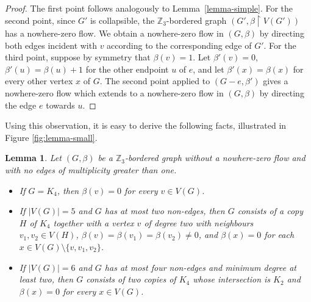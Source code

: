 \documentclass{article}
\newcommand{\Z}{\mathbb{Z}_3}
\newtheorem{lemma}[theorem]{Lemma}
\begin{document}
\begin{proof}
The first point follows analogously to Lemma~\ref{lemma-simple}.  For the second point, since $G'$ is collapsible,
the $\Z$-bordered graph $(G',\beta\restriction V(G'))$ has a nowhere-zero flow. We obtain a nowhere-zero flow in $(G,\beta)$ by directing both edges incident with $v$ according
to the corresponding edge of $G'$.  For the third point, suppose by symmetry that $\beta(v)=1$.  Let $\beta'(v)=0$, $\beta'(u)=\beta(u)+1$
for the other endpoint $u$ of $e$, and let $\beta'(x)=\beta(x)$ for every other vertex $x$ of $G$.  The second point applied to $(G-e,\beta')$
gives a nowhere-zero flow which extends to a nowhere-zero flow in $(G,\beta)$ by directing the edge $e$ towards $u$.
\end{proof}



Using this observation, it is easy to derive the following facts, illustrated in Figure \ref{fig:lemma-small}.


\begin{lemma}\label{lemma-small}
Let $(G,\beta)$ be a $\Z$-bordered graph without a nowhere-zero flow and with no edges of multiplicity greater than one.
\begin{itemize}
\item If $G=K_4$, then $\beta(v)=0$ for every $v\in V(G)$.
\item If $|V(G)|=5$ and $G$ has at most two non-edges, then $G$ consists of a copy $H$ of $K_4$ together with a vertex $v$ of degree two with neighbours $v_1,v_2 \in V(H)$,
$\beta(v)=\beta(v_1)=\beta(v_2)\neq 0$, and $\beta(x)=0$ for each $x\in V(G)\setminus \{v,v_1,v_2\}$.
\item If $|V(G)|=6$ and $G$ has at most four non-edges and minimum degree at least two, then $G$ consists of two copies of $K_4$ whose intersection is $K_2$ and $\beta(x)=0$ for every $x\in V(G)$.
\end{itemize}
\end{lemma}
\end{document}
